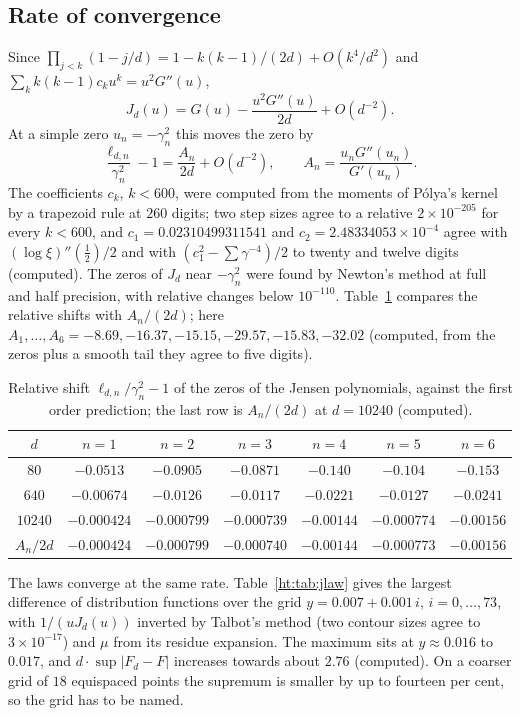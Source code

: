 \subsection{Rate of convergence}
Since $\prod_{j<k}(1-j/d)=1-k(k-1)/(2d)+O(k^4/d^2)$ and $\sum_kk(k-1)c_ku^k=u^2G''(u)$,
\[
J_d(u)=G(u)-\frac{u^2G''(u)}{2d}+O(d^{-2}).
\]
At a simple zero $u_n=-\gamma_n^2$ this moves the zero by
\[
\frac{\ell_{d,n}}{\gamma_n^2}-1=\frac{A_n}{2d}+O(d^{-2}),\qquad A_n=\frac{u_nG''(u_n)}{G'(u_n)} .
\]
The coefficients $c_k$, $k<600$, were computed from the moments of P\'olya's kernel by a trapezoid rule at $260$ digits; two step sizes agree to a relative $2\times10^{-205}$ for every $k<600$, and $c_1=0.02310499311541$ and $c_2=2.48334053\times10^{-4}$ agree with $(\log\xi)''(\tfrac12)/2$ and with $(c_1^2-\sum\gamma^{-4})/2$ to twenty and twelve digits (computed). The zeros of $J_d$ near $-\gamma_n^2$ were found by Newton's method at full and half precision, with relative changes below $10^{-110}$. Table~\ref{ht:tab:jensen} compares the relative shifts with $A_n/(2d)$; here $A_1,\dots,A_6=-8.69,-16.37,-15.15,-29.57,-15.83,-32.02$ (computed, from the zeros plus a smooth tail they agree to five digits).

\begin{table}[ht]
\centering\scriptsize\setlength{\tabcolsep}{3pt}
\begin{tabular}{ccccccc}
\toprule
$d$ & $n=1$ & $n=2$ & $n=3$ & $n=4$ & $n=5$ & $n=6$ \\
\midrule
$80$ & $-0.0513$ & $-0.0905$ & $-0.0871$ & $-0.140$ & $-0.104$ & $-0.153$ \\
$640$ & $-0.00674$ & $-0.0126$ & $-0.0117$ & $-0.0221$ & $-0.0127$ & $-0.0241$ \\
$10240$ & $-0.000424$ & $-0.000799$ & $-0.000739$ & $-0.00144$ & $-0.000774$ & $-0.00156$ \\
$A_n/2d$ & $-0.000424$ & $-0.000799$ & $-0.000740$ & $-0.00144$ & $-0.000773$ & $-0.00156$ \\
\bottomrule
\end{tabular}
\caption{Relative shift $\ell_{d,n}/\gamma_n^2-1$ of the zeros of the Jensen polynomials, against the first order prediction; the last row is $A_n/(2d)$ at $d=10240$ (computed).}\label{ht:tab:jensen}
\end{table}

The laws converge at the same rate. Table~\ref{ht:tab:jlaw} gives the largest difference of distribution functions over the grid $y=0.007+0.001\,i$, $i=0,\dots,73$, with $1/(uJ_d(u))$ inverted by Talbot's method (two contour sizes agree to $3\times10^{-17}$) and $\mu$ from its residue expansion. The maximum sits at $y\approx0.016$ to $0.017$, and $d\cdot\sup|F_d-F|$ increases towards about $2.76$ (computed). On a coarser grid of $18$ equispaced points the supremum is smaller by up to fourteen per cent, so the grid has to be named.

